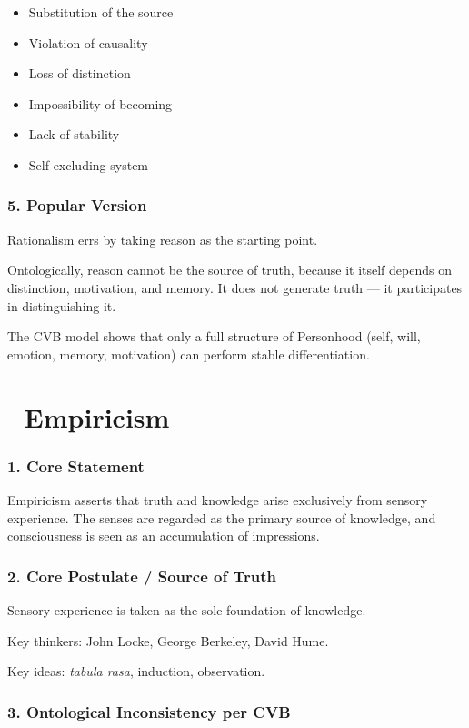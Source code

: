 \documentclass[12pt]{article}
\begin{document}
\begin{itemize}
\item Substitution of the source
\item Violation of causality
\item Loss of distinction
\item Impossibility of becoming
\item Lack of stability
\item Self-excluding system
\end{itemize}

\subsubsection*{5. Popular Version}

Rationalism errs by taking reason as the starting point.

Ontologically, reason cannot be the source of truth, because it itself depends on distinction, motivation, and memory. It does not generate truth — it participates in distinguishing it.

The CVB model shows that only a full structure of Personhood (self, will, emotion, memory, motivation) can perform stable differentiation.

\section*{🔷 Empiricism}

\subsubsection*{1. Core Statement}

Empiricism asserts that truth and knowledge arise exclusively from sensory experience. The senses are regarded as the primary source of knowledge, and consciousness is seen as an accumulation of impressions.

\subsubsection*{2. Core Postulate / Source of Truth}

Sensory experience is taken as the sole foundation of knowledge.

Key thinkers: John Locke, George Berkeley, David Hume.

Key ideas: \textit{tabula rasa}, induction, observation.

\subsubsection*{3. Ontological Inconsistency per CVB}
\end{document}
